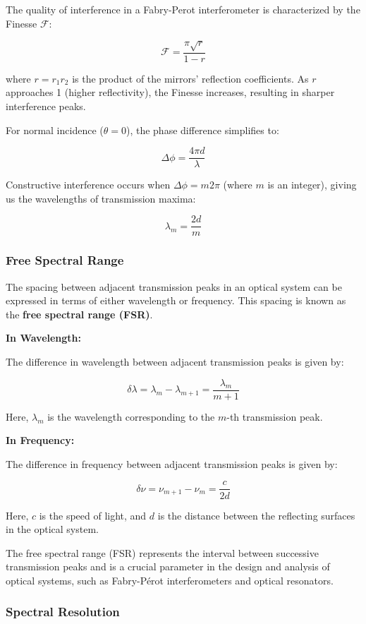 \documentclass[
  a4paper,
]{book}
\begin{document}
The quality of interference in a Fabry-Perot interferometer is
characterized by the Finesse \(\mathcal{F}\):

\[
\mathcal{F}=\frac{\pi \sqrt{r}}{1-r}
\]

where \(r=r_1r_2\) is the product of the mirrors' reflection
coefficients. As \(r\) approaches 1 (higher reflectivity), the Finesse
increases, resulting in sharper interference peaks.

For normal incidence (\(\theta=0\)), the phase difference simplifies to:

\[
\Delta\phi=\frac{4\pi d}{\lambda}
\]

Constructive interference occurs when \(\Delta\phi=m2\pi\) (where \(m\)
is an integer), giving us the wavelengths of transmission maxima:

\[
\lambda_m=\frac{2d}{m}
\]

\subsubsection{Free Spectral Range}\label{free-spectral-range}

The spacing between adjacent transmission peaks in an optical system can
be expressed in terms of either wavelength or frequency. This spacing is
known as the \textbf{free spectral range (FSR)}.

\textbf{In Wavelength:}

The difference in wavelength between adjacent transmission peaks is
given by:

\[
   \delta \lambda = \lambda_{m} - \lambda_{m+1} = \frac{\lambda_m}{m+1}
   \]

Here, \(\lambda_m\) is the wavelength corresponding to the \(m\)-th
transmission peak.

\textbf{In Frequency:}

The difference in frequency between adjacent transmission peaks is given
by:

\[
   \delta \nu = \nu_{m+1} - \nu_m = \frac{c}{2d}
   \]

Here, \(c\) is the speed of light, and \(d\) is the distance between the
reflecting surfaces in the optical system.

The free spectral range (FSR) represents the interval between successive
transmission peaks and is a crucial parameter in the design and analysis
of optical systems, such as Fabry-Pérot interferometers and optical
resonators.

\subsubsection{Spectral Resolution}\label{spectral-resolution}
\end{document}
